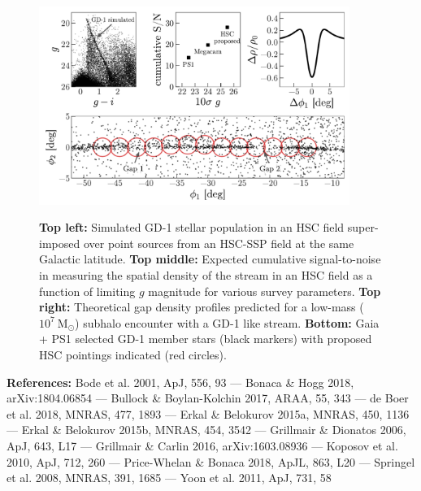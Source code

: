 \documentclass[11pt]{article}
\begin{document}
\begin{figure}[t]
\begin{center}
\includegraphics[width=0.9\textwidth]{figure1.pdf}
\caption{
\textbf{Top left:} Simulated GD-1 stellar population in an HSC field super-imposed over point sources from an HSC-SSP field at the same Galactic latitude.
\textbf{Top middle:} Expected cumulative signal-to-noise in measuring the spatial density of the stream in an HSC field as a function of limiting $g$ magnitude for various survey parameters.
\textbf{Top right:} Theoretical gap density profiles predicted for a low-mass ($10^7~\textrm{M}_\odot$) subhalo encounter with a GD-1 like stream.
\textbf{Bottom:} Gaia + PS1 selected GD-1 member stars (black markers) with proposed HSC pointings indicated (red circles).
}
\vspace{-1.5em}
\label{fig:}
\end{center}
\end{figure}

\textbf{References:}
Bode et al. 2001, ApJ, 556, 93 ---
Bonaca \& Hogg 2018, arXiv:1804.06854 ---
Bullock \& Boylan-Kolchin 2017, ARAA, 55, 343 ---
de Boer et al. 2018, MNRAS, 477, 1893 ---
Erkal \& Belokurov 2015a, MNRAS, 450, 1136 ---
Erkal \& Belokurov 2015b, MNRAS, 454, 3542 ---
Grillmair \& Dionatos 2006, ApJ, 643, L17 ---
Grillmair \& Carlin 2016, arXiv:1603.08936 ---
Koposov et al. 2010, ApJ, 712, 260 ---
Price-Whelan \& Bonaca 2018, ApJL, 863, L20 ---
Springel et al. 2008, MNRAS, 391, 1685 ---
Yoon et al. 2011, ApJ, 731, 58
\end{document}
